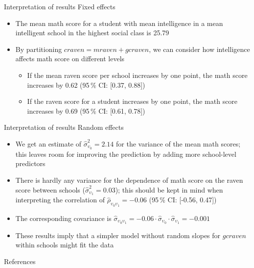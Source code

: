 \documentclass[aspectratio=169]{beamer}
\begin{document}
\begin{frame}{Interpretation of results}
  {Fixed effects}
  \begin{itemize}
    \item The mean math score for a student with mean intelligence in a
          mean intelligent school in the highest social class is 25.79
    \item By partitioning $craven = mraven + gcraven$, we can consider how
      intelligence affects math score on different levels
      \begin{itemize}
        \item If the mean raven score per school increases by one point,
          the math score increases by 0.62 (95\,\% CI: [0.37, 0.88])
        \item If the raven score for a student increases by one point, the
          math score increases by 0.69 (95\,\% CI: [0.61, 0.78])
      \end{itemize}
  \end{itemize}
\end{frame}

\begin{frame}{Interpretation of results}
  {Random effects}
  \begin{itemize}
    \item We get an estimate of $\hat \sigma^2_{\upsilon_{0}} = 2.14$ for
      the variance of the mean math scores; this leaves room for improving
      the prediction by adding more school-level predictors
    \item There is hardly any variance for the dependence of math score on
      the raven score between schools ($\hat \sigma^2_{\upsilon_{1}} =
      0.03$); this should be kept in mind when interpreting the correlation
      of $\hat \rho_{\upsilon_{0}\upsilon_1} = -0.06$ (95\,\% CI: [-0.56,
      0.47])
    \item The corresponding covariance is $\hat
      \sigma_{\upsilon_{0}\upsilon_1} = -0.06 \cdot \hat
      \sigma_{\upsilon_{0}} \cdot \hat \sigma_{\upsilon_{1}} = -0.001$
    \item These results imply that a simpler model without random slopes for
      $gcraven$ within schools might fit the data
  \end{itemize}
\end{frame}


\appendix
\begin{frame}{References}
  \printbibliography
\end{frame}
\end{document}
